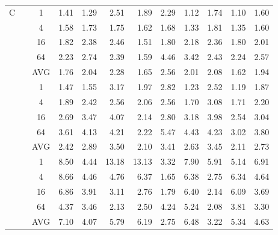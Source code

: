 \begin{table*}[!b]
\begin{center}
{\begin{tabular}{|c|c|c|n{2}{1}n{2}{1}n{2}{1}n{2}{1}n{2}{1}n{2}{1}n{2}{1}n{2}{1}|n{2}{1}|}
  &  & 1  & 1.41 & 1.29 &  2.51 &  1.89 & 2.29 & 1.12 & 1.74 & 1.10 & 1.60 \\
 & & 4   & 1.58 & 1.73 &  1.75 &  1.62 & 1.68 & 1.33 & 1.81 & 1.35 & 1.60 \\
 & & 16  & 1.82 & 2.38 &  2.46 &  1.51 & 1.80 & 2.18 & 2.36 & 1.80 & 2.01 \\
 & & 64  & 2.23 & 2.74 &  2.39 &  1.59 & 4.46 & 3.42 & 2.43 & 2.24 & 2.57 \\  
 & & AVG & 1.76 & 2.04 &  2.28 &  1.65 & 2.56 & 2.01 & 2.08 & 1.62 & {\boldmath}1.94 \\  
 &  & 1 & 1.47 & 1.55 &  3.17 &  1.97 & 2.82 & 1.23 & 2.52 & 1.19 & 1.87 \\
 & & 4   & 1.89 & 2.42 &  2.56 &  2.06 & 2.56 & 1.70 & 3.08 & 1.71 & 2.20 \\
 & & 16  & 2.69 & 3.47 &  4.07 &  2.14 & 2.80 & 3.18 & 3.98 & 2.54 & 3.04 \\
 & & 64  & 3.61 & 4.13 &  4.21 &  2.22 & 5.47 & 4.43 & 4.23 & 3.02 & 3.80 \\ 
 & & AVG & 2.42 & 2.89 &  3.50 &  2.10 & 3.41 & 2.63 & 3.45 & 2.11 & {\boldmath}2.73 \\  
 &  & 1 & 8.50 & 4.44 & 13.18 & 13.13 & 3.32 & 7.90 & 5.91 & 5.14 & 6.91 \\
 & & 4   & 8.66 & 4.46 &  4.76 &  6.37 & 1.65 & 6.38 & 2.75 & 6.34 & 4.64 \\
 & & 16  & 6.86 & 3.91 &  3.11 &  2.76 & 1.79 & 6.40 & 2.14 & 6.09 & 3.69 \\
 & & 64  & 4.37 & 3.46 &  2.13 &  2.50 & 4.24 & 5.24 & 2.08 & 3.81 & 3.30 \\ 
 & & AVG & 7.10 & 4.07 &  5.79 &  6.19 & 2.75 & 6.48 & 3.22 & 5.34 & {\boldmath}4.63 \\ \hline
\end{tabular}}
\npnoround
\end{center}
\end{table*}

\fi
